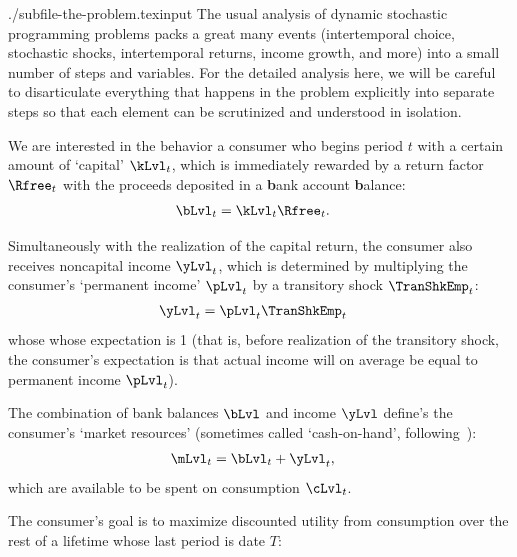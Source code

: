 \documentclass[titlepage, headings=optiontotocandhead]{\econtex}
\providecommand{\interval}{period}\renewcommand{\interval}{period}
\providecommand{\interval}{period}\renewcommand{\interval}{period}
\begin{document}
\begin{verbatimwrite}{./subfile-the-problem.texinput}
The usual analysis of dynamic stochastic programming problems packs a great many events (intertemporal choice, stochastic shocks, intertemporal returns, income growth, and more) into a small number of steps and variables. For the detailed analysis here, we will be careful to disarticulate everything that happens in the problem explicitly into separate steps so that each element can be scrutinized and understood in isolation.

We are interested in the behavior a consumer who begins {\interval} $t$ with a certain amount of `capital' $\kLvl_{t}$, which is immediately rewarded by a return factor $\Rfree_{t}$ with the proceeds deposited in a \textbf{b}ank account \textbf{b}alance:
\begin{equation}\begin{gathered}\begin{aligned}
  \bLvl_{t} & = \kLvl_{t}\Rfree_{t}. \label{eq:bLvl}
\end{aligned}\end{gathered}\end{equation}

Simultaneously with the realization of the capital return, the consumer also receives noncapital income $\yLvl_{t}$, which is determined by multiplying the consumer's `permanent income' $\pLvl_{t}$ by a transitory shock $\TranShkEmp_{t}$:
\begin{equation}\begin{gathered}\begin{aligned}
  \yLvl_{t} & = \pLvl_{t}\TranShkEmp_{t} \label{eq:yLvl}
\end{aligned}\end{gathered}\end{equation}
whose whose expectation is 1 (that is, before realization of the transitory shock, the consumer's expectation is that actual income will on average be equal to permanent income $\pLvl_{t}$).

The combination of bank balances $\bLvl$ and income $\yLvl$ define's the consumer's `market resources' (sometimes called `cash-on-hand', following~\cite{deatonUnderstandingC}):
\begin{equation}\begin{gathered}\begin{aligned}
  \mLvl_{t} & = \bLvl_{t}+\yLvl_{t} \label{eq:mLvl}, 
\end{aligned}\end{gathered}\end{equation}
which are available to be spent on consumption $\cLvl_{t}$.  

The consumer's goal is to maximize discounted utility from consumption over the rest of a lifetime whose last {\interval} is date $T$:
\end{verbatimwrite}

\end{document}
